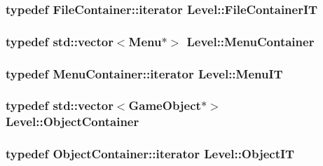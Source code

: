\subsubsection[{\texorpdfstring{File\+Container\+IT}{FileContainerIT}}]{\setlength{\rightskip}{0pt plus 5cm}typedef File\+Container\+::iterator {\bf Level\+::\+File\+Container\+IT}}\hypertarget{classLevel_a224d56acc904d825c861cfad99447ff5}{}\label{classLevel_a224d56acc904d825c861cfad99447ff5}
\subsubsection[{\texorpdfstring{Menu\+Container}{MenuContainer}}]{\setlength{\rightskip}{0pt plus 5cm}typedef std\+::vector$<${\bf Menu}$\ast$$>$ {\bf Level\+::\+Menu\+Container}}\hypertarget{classLevel_a8ca95fd4c2a029af4f4df92c24556314}{}\label{classLevel_a8ca95fd4c2a029af4f4df92c24556314}
\subsubsection[{\texorpdfstring{Menu\+IT}{MenuIT}}]{\setlength{\rightskip}{0pt plus 5cm}typedef Menu\+Container\+::iterator {\bf Level\+::\+Menu\+IT}}\hypertarget{classLevel_a89febf236e700e1be35f55d5d79776b0}{}\label{classLevel_a89febf236e700e1be35f55d5d79776b0}
\subsubsection[{\texorpdfstring{Object\+Container}{ObjectContainer}}]{\setlength{\rightskip}{0pt plus 5cm}typedef std\+::vector$<${\bf Game\+Object}$\ast$$>$ {\bf Level\+::\+Object\+Container}}\hypertarget{classLevel_afd39ad8a5d9272ab8e14853e0fb18a48}{}\label{classLevel_afd39ad8a5d9272ab8e14853e0fb18a48}
\subsubsection[{\texorpdfstring{Object\+IT}{ObjectIT}}]{\setlength{\rightskip}{0pt plus 5cm}typedef Object\+Container\+::iterator {\bf Level\+::\+Object\+IT}}\hypertarget{classLevel_a9a28b71fee93442a0a6e38075e96b0a3}{}\label{classLevel_a9a28b71fee93442a0a6e38075e96b0a3}


